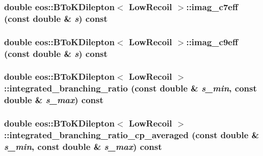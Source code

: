\label{classeos_1_1BToKDilepton_3_01LowRecoil_01_4_aecc334af199b1b9c16db9018e4a61b85}
\hypertarget{classeos_1_1BToKDilepton_3_01LowRecoil_01_4_ad8318f4a6c28e023fefe08ca671d7211}{
\subsubsection[{imag\_\-c7eff}]{\setlength{\rightskip}{0pt plus 5cm}double eos::BToKDilepton$<$ {\bf LowRecoil} $>$::imag\_\-c7eff (const double \& {\em s}) const}}
\label{classeos_1_1BToKDilepton_3_01LowRecoil_01_4_ad8318f4a6c28e023fefe08ca671d7211}
\hypertarget{classeos_1_1BToKDilepton_3_01LowRecoil_01_4_a28bbb7fdde3f07f19b94983456f0b6d7}{
\subsubsection[{imag\_\-c9eff}]{\setlength{\rightskip}{0pt plus 5cm}double eos::BToKDilepton$<$ {\bf LowRecoil} $>$::imag\_\-c9eff (const double \& {\em s}) const}}
\label{classeos_1_1BToKDilepton_3_01LowRecoil_01_4_a28bbb7fdde3f07f19b94983456f0b6d7}
\hypertarget{classeos_1_1BToKDilepton_3_01LowRecoil_01_4_a330a3d90e0165b7e18fce47207ad288e}{
\subsubsection[{integrated\_\-branching\_\-ratio}]{\setlength{\rightskip}{0pt plus 5cm}double eos::BToKDilepton$<$ {\bf LowRecoil} $>$::integrated\_\-branching\_\-ratio (const double \& {\em s\_\-min}, \/  const double \& {\em s\_\-max}) const}}
\label{classeos_1_1BToKDilepton_3_01LowRecoil_01_4_a330a3d90e0165b7e18fce47207ad288e}
\hypertarget{classeos_1_1BToKDilepton_3_01LowRecoil_01_4_a13204b4a9edf339d616343b3b739fd5e}{
\subsubsection[{integrated\_\-branching\_\-ratio\_\-cp\_\-averaged}]{\setlength{\rightskip}{0pt plus 5cm}double eos::BToKDilepton$<$ {\bf LowRecoil} $>$::integrated\_\-branching\_\-ratio\_\-cp\_\-averaged (const double \& {\em s\_\-min}, \/  const double \& {\em s\_\-max}) const}}
